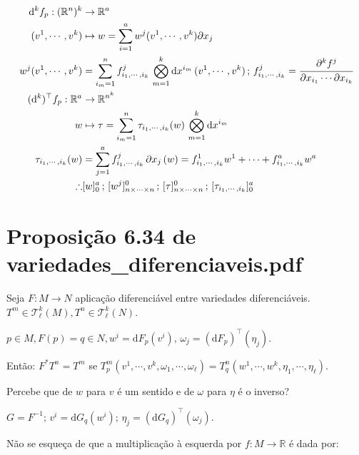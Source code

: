 \documentclass[12pt]{article}
\begin{document}
\begin{align}
	\mathrm{d}^k f_p : (\mathbb{R}^n)^k &\rightarrow \mathbb{R}^a \\
	(v^1, \cdots, v^k) &\mapsto w = \sum_{i = 1}^a w^j(v^1, \cdots, v^k) \partial x_j \\
	w^j(v^1, \cdots, v^k) &= \sum_{i_m = 1}^n f_{i_1, \cdots, i_k}^j\, \bigotimes_{m = 1}^{k} \mathrm{d}x^{i_m} \,(v^1, \cdots, v^k)\,;\,f^j_{i_1, \cdots, i_k} = \cfrac{\partial^k f^j}{\partial x_{i_1} \cdots \partial x_{i_k}} \\
	(\mathrm{d}^k)^\top f_p : \mathbb{R}^a &\rightarrow \mathbb{R}^{n^k} \\
	w &\mapsto \tau = \sum_{i_m = 1}^n \tau_{i_1, \cdots, i_k}(w)\, \bigotimes_{m = 1}^{k} \mathrm{d}x^{i_m} \\
	\tau_{i_1, \cdots, i_k} (w) &= \sum_{j = 1}^a f_{i_1, \cdots, i_k}^j\, \partial x_j\,(w) = f_{i_1, \cdots, i_k}^1 w^1 + \cdots + f_{i_1, \cdots, i_k}^a w^a \\
	\therefore &[w]_0^a\,;\,[w^j]_{n \times \cdots \times n}^0\,;\,[\tau]_{n \times \cdots \times n}^0\,;\,[\tau_{i_1, \cdots, i_k}]_0^a \\
\end{align}

\section{Proposi\c{c}\~ao 6.34 de variedades\_diferenciaveis.pdf}
		\begin{flushright}
		\end{flushright}

		Seja $F: M \rightarrow N$ aplica\c{c}\~ao diferenci\'avel entre variedades diferenci\'aveis.  $T^m \in \mathcal{T}^k_\ell(M), T^n \in \mathcal{T}^k_\ell(N)$.

		$p \in M, F(p) = q \in N, w^i = \mathrm{d}F_p (v^i), \,\omega_j = (\mathrm{d}F_p)^\top (\eta_j)$.

		Ent\~ao: $F^* T^n = T^m$ se $T^m_p (v^1, \cdots, v^k, \omega_1, \cdots, \omega_\ell) = T_q^n (w^1, \cdots, w^k, \eta_1, \cdots, \eta_\ell)$.

		Percebe que de $w$ para $v$ \'e um sentido e de $\omega$ para $\eta$ \'e o inverso?

		$G = F^{-1};\,v^i = \mathrm{d}G_q(w^i);\,\eta_j = (\mathrm{d}G_q)^\top (\omega_j)$.

		\vspace{3mm}

		N\~ao se esque\c{c}a de que a multiplica\c{c}\~ao \`a esquerda por $f : M \rightarrow \mathbb{R}$ \'e dada por:
\end{document}

